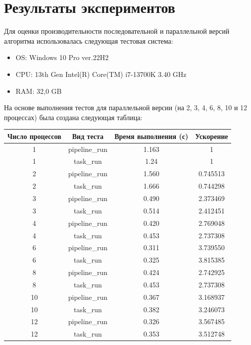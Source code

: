 \documentclass[a4paper,12pt]{article}
\begin{document}
\section{Результаты экспериментов}
Для оценки производительности последовательной и параллельной версий алгоритма использовалась следующая тестовая система:
\begin{itemize}
    \item OS: Windows 10 Pro ver.22H2
    \item CPU: 13th Gen Intel(R) Core(TM) i7-13700K   3.40 GHz
    \item RAM: 32,0 GB
\end{itemize}

На основе выполнения тестов для параллельной версии (на 2, 3, 4, 6, 8, 10 и 12 процессах) была создана следующая таблица:

\begin{tabular}{|c|c|c|c|}
    \hline
    Число процессов & Вид теста      & Время выполнения (с) & Ускорение \\ \hline
    1               & pipeline\_run & 1.163               & 1      \\ \hline
    1               & task\_run     & 1.24                & 1      \\ \hline
    2               & pipeline\_run & 1.560                & 0.745513      \\ \hline
    2               & task\_run     & 1.666                & 0.744298      \\ \hline
    3               & pipeline\_run & 0.490                & 2.373469      \\ \hline
    3               & task\_run     & 0.514                & 2.412451      \\ \hline
    4               & pipeline\_run & 0.420               & 2.769048     \\ \hline
    4               & task\_run     & 0.453                & 2.737308      \\ \hline
    6              & pipeline\_run & 0.311                & 3.739550      \\ \hline
    6              & task\_run     & 0.325                & 3.815385      \\ \hline
    8              & pipeline\_run & 0.424                & 2.742925      \\ \hline
    8              & task\_run     & 0.453                & 2.737308      \\ \hline
    10              & pipeline\_run & 0.367                & 3.168937      \\ \hline
    10              & task\_run     & 0.382                & 3.246073      \\ \hline
    12              & pipeline\_run & 0.326                & 3.567485      \\ \hline
    12              & task\_run     & 0.353                & 3.512748      \\ \hline
\end{tabular}
\end{document}
